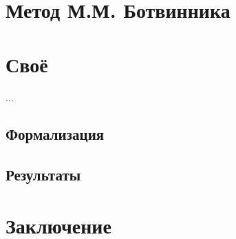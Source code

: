 \documentclass{beamer}
\begin{document}
\section{Метод М.М. Ботвинника}


\section{Своё}
%
\begin{frame}{...}

\end{frame}

\subsection{Формализация}


\subsection{Результаты}


\section{Заключение}

\end{document}
